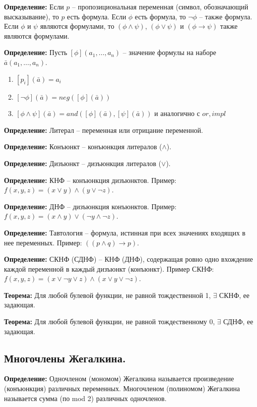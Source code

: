 \textbf{Определение:} Если $p$ -- пропозициональная переменная (символ, обозначающий высказывание), то $p$ есть формула. Если $\phi$ есть формула, то $\neg \phi$ -- также формула. Если $\phi$ и $\psi$ являются формулами, то $(\phi \land \psi)$, $(\phi \lor \psi)$ и $(\phi \to \psi)$ также являются формулами.

\textbf{Определение:} Пусть $[\phi](a_1,\dots,a_n)$ -- значение формулы на наборе $\bar a(a_1,\dots,a_n)$.
\begin{enumerate}
    \item $[p_i](\bar a)=a_i$
    \item $[\neg \phi](\bar a)=neg([\phi](\bar a))$
    \item $[\phi \land \psi](\bar a)=and([\phi](\bar a), [\psi](\bar a))$ и аналогично с $or, impl$
\end{enumerate}

\textbf{Определение:} Литерал -- переменная или отрицание переменной.

\textbf{Определение:} Конъюнкт -- конъюнкция литералов ($\land$).

\textbf{Определение:} Дизъюнкт -- дизъюнкция литералов ($\lor$).

\textbf{Определение:} КНФ -- конъюнкция дизъюнктов. Пример: $f(x,y,z)=(x\lor y)\land(y \lor \neg z)$.

\textbf{Определение:} ДНФ -- дизъюнкция конъюнктов. Пример: $f(x,y,z)=(x\land y)\lor(\neg y \land \neg z)$.

\textbf{Определение:} Тавтология -- формула, истинная при всех значениях входящих в нее переменных. Пример: $((p \land q) \to p)$.

\textbf{Определение:} СКНФ (СДНФ) -- КНФ (ДНФ), содержащая ровно одно вхождение каждой переменной в каждый дизъюнкт (конъюнкт). Пример СКНФ: $f(x,y,z)=(x\lor\neg y\lor z)\land(x\lor y\lor\neg z)$.

\textbf{Теорема:} Для любой булевой функции, не равной тождественной 1, $\exists$ СКНФ, ее задающая.

\textbf{Теорема:} Для любой булевой функции, не равной тождественному 0, $\exists$ СДНФ, ее задающая.

\subsection{Многочлены Жегалкина.}

\textbf{Определение:} Одночленом (мономом) Жегалкина называется произведение (конъюнкция) различных переменных. Многочленом (полиномом) Жегалкина называется сумма (по mod 2) различных одночленов.


